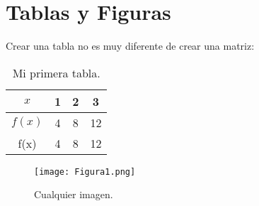 \documentclass{article}
\begin{document}
\section{Tablas y Figuras}

Crear una tabla no es muy diferente de crear una matriz:

\begin{table}
\centering
\caption{Mi primera tabla.}
\begin{tabular}{|c|c|c|c|}
\hline
$x$ & 1 & 2 & 3 \\
\hline
$f(x)$ & 4 & 8 & 12 \\
\hline
f(x) & 4 & 8 & 12 \\
\hline
\end{tabular}
\end{table}

\begin{figure}
\centering
\texttt{[image: Figura1.png]}
\caption{Cualquier imagen.}
\end{figure}
\end{document}
